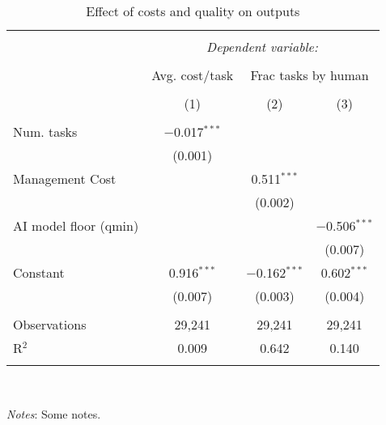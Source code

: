 
\begin{table}[!htbp] \centering 
  \caption{Effect of costs and quality on outputs} 
  \label{tab:outcomes} 
\footnotesize 
\begin{tabular}{@{\extracolsep{-6pt}}lccc} 
\\[-1.8ex]\hline 
\hline \\[-1.8ex] 
 & \multicolumn{3}{c}{\textit{Dependent variable:}} \\ 
\cline{2-4} 
\\[-1.8ex] & Avg. cost/task & \multicolumn{2}{c}{Frac tasks by human} \\ 
\\[-1.8ex] & (1) & (2) & (3)\\ 
\hline \\[-1.8ex] 
 Num. tasks & $-$0.017$^{***}$ &  &  \\ 
  & (0.001) &  &  \\ 
  Management Cost &  & 0.511$^{***}$ &  \\ 
  &  & (0.002) &  \\ 
  AI model floor (qmin) &  &  & $-$0.506$^{***}$ \\ 
  &  &  & (0.007) \\ 
  Constant & 0.916$^{***}$ & $-$0.162$^{***}$ & 0.602$^{***}$ \\ 
  & (0.007) & (0.003) & (0.004) \\ 
 \hline \\[-1.8ex] 
Observations & 29,241 & 29,241 & 29,241 \\ 
R$^{2}$ & 0.009 & 0.642 & 0.140 \\ 
\hline 
\hline \\[-1.8ex] 
\end{tabular}
\\
\begin{minipage}{ \textwidth}
{\footnotesize \emph{Notes}: Some notes.}
\end{minipage}
\end{table}
